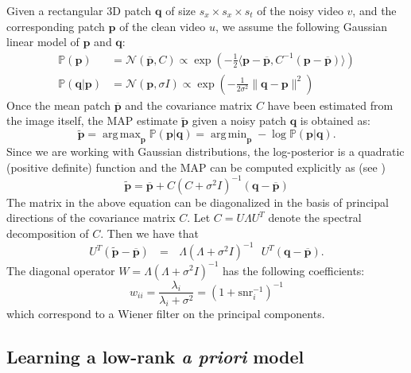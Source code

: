 \documentclass[10pt, journal, twocolumn, final, a4paper]{IEEEtran}
\newcommand{\ma}[1]{\boldsymbol{#1}}
\DeclareMathOperator*{\argmin}{arg\,min}
\DeclareMathOperator*{\argmax}{arg\,max}
\begin{document}
Given a rectangular 3D patch $\ma q$ of size $s_x\times s_x\times s_t$ of the noisy video $v$, and the 
corresponding patch $\ma p$ of the clean video $u$, we assume the following 
Gaussian linear model of $\ma p$ and $\ma q$:
\begin{align}
	\mathds{P}(\ma p) &= \mathcal N(\overline {\ma p}, C) \propto \exp\left(-\frac12\langle \ma p - \overline{\ma p}, C^{-1}(\ma p - \overline{\ma p})\rangle\right) \label{eq:prior}\\
	\mathds{P}(\ma q|\ma p) &= \mathcal N(\ma p, \sigma I) \propto \exp\left(-\frac1{2\sigma^2}\|\ma q - \ma p\|^2\right) \label{eq:obs}
\end{align}
Once the mean patch $\overline{\ma p}$ and the
covariance matrix $C$ have been estimated from the image itself, the MAP
estimate $\widetilde{\ma p}$ given a noisy patch $\ma q$ is obtained as:
\[ \widetilde{\ma p} = \argmax_{\ma p} \mathds P(\ma p | \ma q) = \argmin_{\ma p} -\log \mathds P(\ma p | \ma q). \]
Since we are working with Gaussian distributions, the log-posterior is a quadratic (positive definite)
function and the MAP can be computed explicitly as (see  \cite{Lebrun2013a})
\begin{equation}
	\widetilde{\ma p} = \overline{\ma p} + C(C + \sigma^2 I)^{-1}(\ma q - \overline{\ma p})
	\label{eq:map}
\end{equation}
The matrix in the above equation can be diagonalized in the basis of
principal directions of the covariance matrix $C$.
Let $C = U\Lambda U^T$ denote the spectral decomposition of $C$. Then we have that
\[U^T(\widetilde{\ma p} - \overline{\ma p}) \,\,\,\, = \,\,\,\, 
	\Lambda(\Lambda + \sigma^2 I)^{-1}\,\,\,\,
	U^T (\ma q - \overline{\ma p}).\]
The diagonal operator $W = \Lambda(\Lambda + \sigma^2I)^{-1}$
has the following coefficients:
\begin{equation}
w_{ii} = \frac{\lambda_i}{\lambda_i + \sigma^2}
				 = (1 + \text{snr}_i^{-1})^{-1}
				 \label{eq:wiener_coeffs}
\end{equation}
which correspond to a Wiener filter on the principal components.

%

\subsection{Learning a low-rank \textit{a priori} model}
\end{document}
